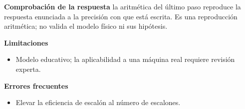 \documentclass[10pt,openany]{book}
\begin{document}
\begin{tcolorbox}[title={Problema resuelto 3}, studiumworked, breakable]
\noindent\textbf{Comprobación de la respuesta} la aritmética del último paso reproduce la respuesta enunciada a la precisión con que está escrita. Es una reproducción aritmética; no valida el modelo físico ni sus hipótesis.

\noindent\textbf{Limitaciones}
\begin{itemize}
\item Modelo educativo; la aplicabilidad a una máquina real requiere revisión experta.
\end{itemize}

\noindent\textbf{Errores frecuentes}
\begin{itemize}
\item Elevar la eficiencia de escalón al número de escalones.
\end{itemize}
\end{tcolorbox}
\end{document}
